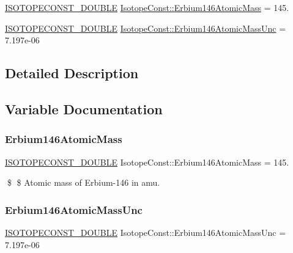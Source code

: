 \begin{DoxyCompactItemize}
\item 
\mbox{\hyperlink{group___isotope_const-_macros_ga8f45a7272ce02c0b4c65c44636ed719a}{I\+S\+O\+T\+O\+P\+E\+C\+O\+N\+S\+T\+\_\+\+D\+O\+U\+B\+LE}} \mbox{\hyperlink{group___isotope_const-_erbium-_er146_ga25bb153152c20ce6e1e2c1122a1433b9}{Isotope\+Const\+::\+Erbium146\+Atomic\+Mass}} = 145.
\item 
\mbox{\hyperlink{group___isotope_const-_macros_ga8f45a7272ce02c0b4c65c44636ed719a}{I\+S\+O\+T\+O\+P\+E\+C\+O\+N\+S\+T\+\_\+\+D\+O\+U\+B\+LE}} \mbox{\hyperlink{group___isotope_const-_erbium-_er146_ga5c59503d7585300706fe8cb88e75c416}{Isotope\+Const\+::\+Erbium146\+Atomic\+Mass\+Unc}} = 7.\+197e-\/06
\end{DoxyCompactItemize}


\subsection{Detailed Description}


\subsection{Variable Documentation}
\mbox{\label{group___isotope_const-_erbium-_er146_ga25bb153152c20ce6e1e2c1122a1433b9}} 
\subsubsection{\texorpdfstring{Erbium146\+Atomic\+Mass}{Erbium146AtomicMass}}
{\footnotesize\ttfamily \mbox{\hyperlink{group___isotope_const-_macros_ga8f45a7272ce02c0b4c65c44636ed719a}{I\+S\+O\+T\+O\+P\+E\+C\+O\+N\+S\+T\+\_\+\+D\+O\+U\+B\+LE}} Isotope\+Const\+::\+Erbium146\+Atomic\+Mass = 145.}

\$ \$ Atomic mass of Erbium-\/146 in amu. \mbox{\label{group___isotope_const-_erbium-_er146_ga5c59503d7585300706fe8cb88e75c416}} 
\subsubsection{\texorpdfstring{Erbium146\+Atomic\+Mass\+Unc}{Erbium146AtomicMassUnc}}
{\footnotesize\ttfamily \mbox{\hyperlink{group___isotope_const-_macros_ga8f45a7272ce02c0b4c65c44636ed719a}{I\+S\+O\+T\+O\+P\+E\+C\+O\+N\+S\+T\+\_\+\+D\+O\+U\+B\+LE}} Isotope\+Const\+::\+Erbium146\+Atomic\+Mass\+Unc = 7.\+197e-\/06}


